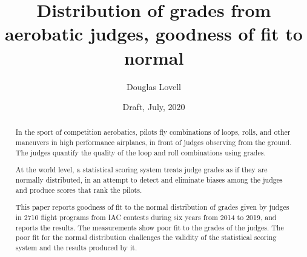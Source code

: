 \documentclass[10pt,twocolumn]{article}
\title{Distribution of grades from aerobatic judges, goodness of fit to normal}
\author{Douglas Lovell}
\date{Draft, July, 2020}
\begin{document}
\maketitle
\begin{abstract}
  In the sport of competition aerobatics, pilots fly combinations of loops,
  rolls, and other maneuvers in high performance airplanes, in front of
  judges observing from the ground.
  The judges quantify the quality of the loop and roll combinations
  using grades.

  At the world level, a statistical
  scoring system treats judge grades as if they are normally distributed,
  in an attempt to detect and eliminate biases among the judges
  and produce scores that rank the pilots.

  This paper reports goodness of fit to the normal distribution of
  grades given by judges in 2710 flight programs from IAC contests
  during six years from 2014 to 2019, and reports the results.
  The measurements show poor fit to the grades of the judges.
  The poor fit for the normal distribution challenges
  the validity of the statistical scoring system and the results produced
  by it.
\end{abstract}












\end{document}

